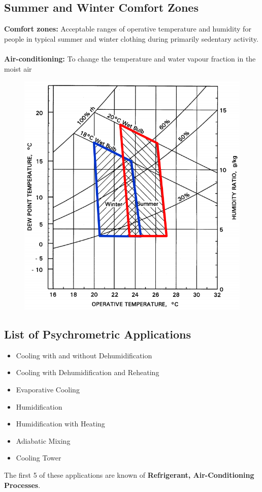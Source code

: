 \documentclass[class=report, crop=false, 12pt,a4paper]{standalone}
\numberwithin{equation}{section}
\begin{document}
\subsection{Summer and Winter Comfort Zones}
\textbf{Comfort zones:} Acceptable ranges of operative temperature and humidity for people in typical summer and winter clothing during primarily sedentary activity. \\\\
\textbf{Air-conditioning:} To change the temperature and water vapour fraction in the moist air
\begin{figure}[H]
  \centering
  \includegraphics[width = 0.55 \textwidth]{../img/diagram107.png}
  \caption{}
\end{figure}
\subsection{List of Psychrometric Applications}
\begin{itemize}[noitemsep]
  \item Cooling with and without Dehumidification
  \item Cooling with Dehumidification and Reheating
  \item Evaporative Cooling
  \item Humidification
  \item Humidification with Heating
  \item Adiabatic Mixing
  \item Cooling Tower
\end{itemize}
The first 5 of these applications are known of \textbf{Refrigerant, Air-Conditioning Processes}.
\end{document}
